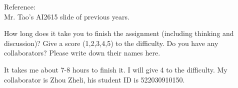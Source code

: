 \documentclass{oxmathproblems}
\begin{document}
\begin{questions}
Reference:\\
Mr. Tao's AI2615 slide of previous years.

\miquestion
How long does it take you to finish the assignment (including thinking and discussion)?
Give a score (1,2,3,4,5) to the difficulty.
Do you have any collaborators?
Please write down their names here.

It takes me about 7-8 hours to finish it. I will give 4 to the difficulty. My collaborator is Zhou Zheli, his student ID is 522030910150.

\end{questions}
\end{document}
